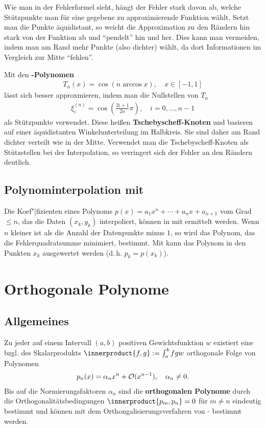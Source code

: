\linie

Wie man in der Fehlerformel sieht, hängt der Fehler stark davon ab, welche
Stützpunkte man für eine gegebene zu approximierende Funktion wählt.
Setzt man die Punkte äquidistant, so weicht die Approximation zu den
Rändern hin stark von der Funktion ab und "`pendelt"' hin und her.
Dies kann man vermeiden, indem man am Rand mehr Punkte (also dichter) wählt,
da dort Informationen im Vergleich zur Mitte "`fehlen"'.

Mit den \textbf{-Polynomen}
\begin{align*}
    T_n(x) = \cos(n \arccos x),\quad x \in [-1, 1]
\end{align*}
lässt sich besser approxmieren, indem man die Nullstellen von $T_n$
\begin{align*}
    \xi_i^{(n)} = \cos\left(\frac{2i + 1}{2n} \pi\right),\quad
    i = 0, \dotsc, n - 1
\end{align*}
als Stützpunkte verwendet.
Diese heißen \textbf{Tschebyscheff-Knoten} und basieren auf einer äquidistanten
Winkelunterteilung im Halbkreis.
Sie sind daher am Rand dichter verteilt wie in der Mitte.
Verwendet man die Tschebyscheff-Knoten als Stützstellen bei der Interpolation,
so verringert sich der Fehler an den Rändern deutlich.

\subsection{%
    Polynominterpolation mit \matlab{}%
}

Die Koef"|fizienten eines Polynoms $p(x) = a_1 x^n + \dotsb + a_n x + a_{n+1}$
vom Grad $\le n$, das die Daten $(x_k, y_k)$ interpoliert, können in \matlab{}
mit  ermittelt werden.
Wenn $n$ kleiner ist als die Anzahl der Datenpunkte minus $1$, so wird das
Polynom, das die Fehlerquadratsumme minimiert, bestimmt.
Mit  kann das Polynom in den Punkten $x_k$ ausgewertet
werden (d.\,h. $p_k = p(x_k)$).

\section{%
    Orthogonale Polynome%
}

\subsection{%
    Allgemeines%
}

Zu jeder auf einem Intervall $(a, b)$ positiven Gewichtsfunktion $w$
existiert eine bzgl. des Skalarprodukts $\innerproduct{f, g} := \int_a^b f g w$
orthogonale Folge von Polynomen
\begin{align*}
    p_n(x) = \alpha_n x^n + \mathcal{O}(x^{n-1}),\quad
    \alpha_n \not= 0.
\end{align*}
Bis auf die Normierungsfaktoren $\alpha_n$ sind die
\textbf{orthogonalen Polynome} durch die Orthogonalitätsbedingungen
$\innerproduct{p_m, p_n} = 0$ für $m \not= n$ eindeutig bestimmt und können
mit dem Orthongalisierungsverfahren von - bestimmt
werden.

